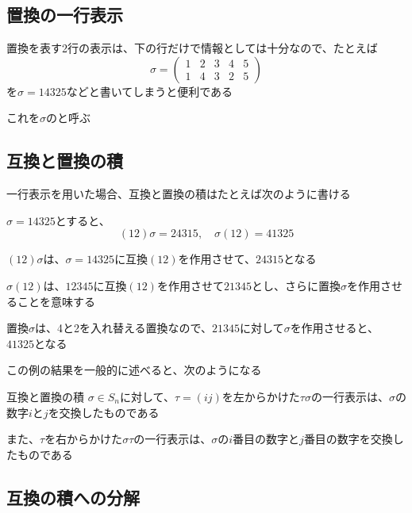 \documentclass[../../../topic_linear-algebra]{subfiles}
\begin{document}
\subsection{置換の一行表示}

置換を表す2行の表示は、下の行だけで情報としては十分なので、たとえば
\begin{equation*}
  \sigma = \begin{pmatrix}
    1 & 2 & 3 & 4 & 5 \\
    1 & 4 & 3 & 2 & 5
  \end{pmatrix}
\end{equation*}
を$\sigma = 14325$などと書いてしまうと便利である

これを$\sigma$のと呼ぶ

\subsection{互換と置換の積}

一行表示を用いた場合、互換と置換の積はたとえば次のように書ける

$\sigma = 14325$とすると、
\begin{equation*}
  (12)\sigma = 24315,\quad \sigma(12) = 41325
\end{equation*}

$(12)\sigma$は、$\sigma = 14325$に互換$(12)$を作用させて、$24315$となる

\br

$\sigma(12)$は、$12345$に互換$(12)$を作用させて$21345$とし、さらに置換$\sigma$を作用させることを意味する

置換$\sigma$は、4と2を入れ替える置換なので、$21345$に対して$\sigma$を作用させると、$41325$となる

\br

この例の結果を一般的に述べると、次のようになる

\begin{theorem}{互換と置換の積}
  $\sigma \in S_n$に対して、$\tau = (ij)$を左からかけた$\tau\sigma$の一行表示は、$\sigma$の数字$i$と$j$を交換したものである

  また、$\tau$を右からかけた$\sigma\tau$の一行表示は、$\sigma$の$i$番目の数字と$j$番目の数字を交換したものである
\end{theorem}

\subsection{互換の積への分解}
\end{document}
